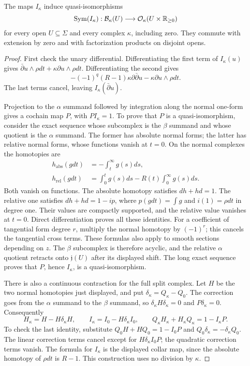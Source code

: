 \begin{theorem}
\label{thm:bf-quantum-boundary}
The maps $I_\kappa$ induce quasi-isomorphisms
\[
 \operatorname{Sym}(I_\kappa):\mathcal B_\kappa(U)
       \longrightarrow\mathcal O_\kappa(U\times\mathbb R_{\ge0})
\]
for every open $U\subseteq\Sigma$ and every complex $\kappa$,
including zero.  They commute with extension by zero and with
factorization products on disjoint opens.
\end{theorem}
\begin{proof}
First check the unary differential.  Differentiating the first term
of $I_\kappa(u)$ gives
$\bar\partial u\wedge\rho dt+\kappa\partial u\wedge\rho dt$.
Differentiating the second gives
\[
 -(-1)^q(R-1)\kappa\partial\bar\partial u
                          -\kappa\partial u\wedge\rho dt.
\]
The last terms cancel, leaving $I_\kappa(\bar\partial u)$.

Projection to the $\alpha$ summand followed by integration along the
normal one-form gives a cochain map $P$, with $PI_\kappa=1$.
To prove that $P$ is a quasi-isomorphism, consider the exact sequence
whose subcomplex is the $\beta$ summand and whose quotient is the
$\alpha$ summand.  The former has absolute normal forms; the latter
has relative normal forms, whose functions vanish at $t=0$.
On the normal complexes the homotopies are
\[
 \begin{split}
 h_{\mathrm{abs}}(gdt)&=-\int_t^\infty g(s)ds,\\
 h_{\mathrm{rel}}(gdt)&=\int_0^t g(s)ds-R(t)\int_0^\infty g(s)ds.
 \end{split}
\]
Both vanish on functions.  The absolute homotopy satisfies $dh+hd=1$.
The relative one satisfies $dh+hd=1-ip$, where
$p(gdt)=\int g$ and $i(1)=\rho dt$ in degree one.
Their values are compactly supported, and the relative value vanishes
at $t=0$.  Direct differentiation proves all these identities.
For a coefficient of tangential form degree $r$, multiply the
normal homotopy by $(-1)^r$; this cancels the tangential cross terms.
These formulas also apply to smooth sections depending on $z$.
The $\beta$ subcomplex is therefore acyclic, and the relative
$\alpha$ quotient retracts onto $\mathfrak j(U)$ after its displayed
shift.  The long exact sequence proves that $P$, hence $I_\kappa$,
is a quasi-isomorphism.

There is also a continuous contraction for the full split complex.
Let $H$ be the two normal homotopies just displayed, and put
$\delta_\kappa=Q_\kappa-Q_0$.  The correction goes from the
$\alpha$ summand to the $\beta$ summand, so
$\delta_\kappa H\delta_\kappa=0$ and $P\delta_\kappa=0$.
Consequently
\[
 H_\kappa=H-H\delta_\kappa H,\qquad
 I_\kappa=I_0-H\delta_\kappa I_0,\qquad
 Q_\kappa H_\kappa+H_\kappa Q_\kappa=1-I_\kappa P.
\]
To check the last identity, substitute
$Q_0H+HQ_0=1-I_0P$ and
$Q_0\delta_\kappa=-\delta_\kappa Q_0$.
The linear correction terms cancel except for
$H\delta_\kappa I_0P$; the quadratic correction terms vanish.
The formula for $I_\kappa$ is the displayed collar map, since the
absolute homotopy of $\rho dt$ is $R-1$.
This construction uses no division by $\kappa$.


\end{proof}
